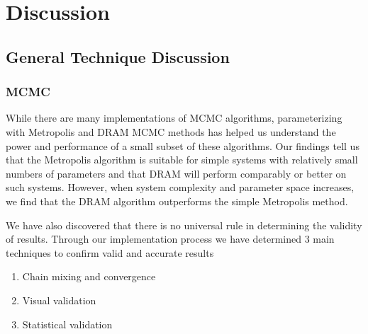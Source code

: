 \section{Discussion} \label{DISCUSSION}

\subsection{General Technique Discussion}

\subsubsection{MCMC} 
While there are many implementations of MCMC algorithms, parameterizing with Metropolis and DRAM MCMC methods has helped us understand the power and performance of a small subset of these algorithms. Our findings tell us that the Metropolis algorithm is suitable for simple systems with relatively small numbers of parameters and that DRAM will perform comparably or better on such systems. However, when system complexity and parameter space increases, we find that the DRAM algorithm outperforms the simple Metropolis method. 
\par We have also discovered that there is no universal rule in determining the validity of results. Through our implementation process we have determined 3 main techniques to confirm valid and accurate results
\begin{enumerate}
    \item Chain mixing and convergence
    \item Visual validation
    \item Statistical validation
\end{enumerate}
